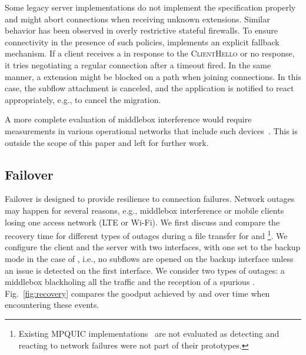 Some legacy \tls server implementations do not implement the \tls specification properly and might abort connections when receiving unknown \tls extensions. Similar behavior has been observed in overly restrictive stateful firewalls. To ensure connectivity in the presence of such policies, \tcpls implements an explicit fallback mechanism. If a client receives a \tcp \rst in response to the \tcpls \textsc{ClientHello} or no response, it tries negotiating a regular \tls connection after a timeout fired. In the same manner, a \join extension might be blocked on a path when joining connections. In this case, the subflow
attachment is canceled, and the application is notified to react appropriately, e.g., to cancel the migration.

A more complete evaluation of middlebox interference would require measurements
in various operational networks that include such
devices~\cite{honda2011still,raman2020measuring,o2016tls}. This is
outside the scope of this paper and left for further work.



\subsection{Failover}
\label{sec:eval_failover}

Failover is designed to provide resilience to \tcpls connection failures. Network outages may happen for several reasons, e.g., middlebox interference or mobile clients losing one access network (LTE or Wi-Fi). We first discuss and compare the recovery time for different types of outages during a file transfer for \tcpls and \mptcp \footnote{Existing MPQUIC implementations~\cite{de2017multipath,de2019pluginizing} are not evaluated as detecting and reacting to network failures were not part of their prototypes.}.
We configure the client and the server with two interfaces, with one set to the
backup mode in the case of \mptcp, i.e., no subflows are opened on the backup
interface unless an issue is detected on the first interface. We consider two
types of outages: a middlebox blackholing all the traffic and the reception of a
spurious \rst. Fig.~\ref{fig:recovery} compares the goodput achieved by \mptcp and \tcpls over time when encountering these events.

